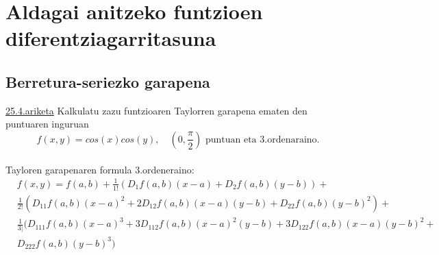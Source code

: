 \chapter{Aldagai anitzeko funtzioen diferentziagarritasuna}
\section{Berretura-seriezko garapena}
\underline{25.4.ariketa} Kalkulatu zazu funtzioaren Taylorren garapena ematen den puntuaren inguruan
\begin{equation*}
    f(x,y)=cos(x)cos(y), \quad (0,\frac{\pi}{2}) \text{ puntuan eta 3.ordenaraino.}
\end{equation*}
\\
Tayloren garapenaren formula 3.ordeneraino:
\begin{equation*}
\begin{split}
    &f(x,y)=f(a,b)+\frac{1}{1!}(D_1f(a,b)(x-a)+D_2f(a,b)(y-b))+\\
    &\frac{1}{2!}(D_{11}f(a,b)(x-a)^2 +2 D_{12}f(a,b)(x-a)(y-b)+D_{22}f(a,b)(y-b)^2)+\\
    &\frac{1}{3|}(D_{111}f(a,b)(x-a)^3+3D_{112}f(a,b)(x-a)^2(y-b)+3D_{122}f(a,b)(x-a)(y-b)^2+\\
    &D_{222}f(a,b)(y-b)^3)
\end{split}
\end{equation*}
